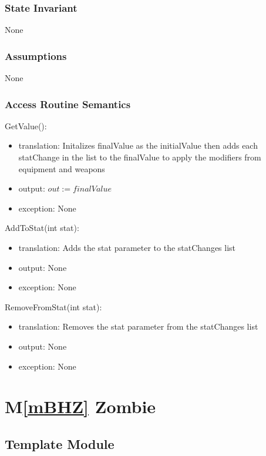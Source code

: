 \documentclass[12pt]{article}
\newcommand{\mref}[1]{M\ref{#1}}
\begin{document}
\subsubsection* {State Invariant}

None

\subsubsection* {Assumptions}

None

\subsubsection* {Access Routine Semantics}

\noindent GetValue():
\begin{itemize}
\item translation: Initalizes finalValue as the initialValue then adds each statChange in the list to the finalValue to apply the modifiers from equipment and weapons
\item output: $out := finalValue$
\item exception: None
\end{itemize}

\noindent AddToStat(int stat):
\begin{itemize}
\item translation: Adds the stat parameter to the statChanges list
\item output: None
\item exception: None
\end{itemize}

\noindent RemoveFromStat(int stat):
\begin{itemize}
\item translation: Removes the stat parameter from the statChanges list
\item output: None
\item exception: None
\end{itemize}

\newpage

\section* {\mref{mBHZ} Zombie}

\subsection*{Template Module}
\end{document}
